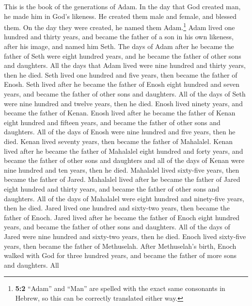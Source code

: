  This is the book of the generations of Adam. In the day
that God created man, he made him in God's likeness.  He
created them male and female, and blessed them. On the day they were
created, he named them Adam.\footnote{\textbf{5:2} ``Adam'' and ``Man''
  are spelled with the exact same consonants in Hebrew, so this can be
  correctly translated either way.}  Adam lived one
hundred and thirty years, and became the father of a son in his own
likeness, after his image, and named him Seth.  The days
of Adam after he became the father of Seth were eight hundred years, and
he became the father of other sons and daughters.  All the
days that Adam lived were nine hundred and thirty years, then he died.
 Seth lived one hundred and five years, then became the
father of Enosh.  Seth lived after he became the father of
Enosh eight hundred and seven years, and became the father of other sons
and daughters.  All of the days of Seth were nine hundred
and twelve years, then he died.  Enosh lived ninety years,
and became the father of Kenan.  Enosh lived after he
became the father of Kenan eight hundred and fifteen years, and became
the father of other sons and daughters.  All of the days
of Enosh were nine hundred and five years, then he died. 
Kenan lived seventy years, then became the father of Mahalalel.
 Kenan lived after he became the father of Mahalalel
eight hundred and forty years, and became the father of other sons and
daughters  and all of the days of Kenan were nine hundred
and ten years, then he died.  Mahalalel lived sixty-five
years, then became the father of Jared.  Mahalalel lived
after he became the father of Jared eight hundred and thirty years, and
became the father of other sons and daughters.  All of
the days of Mahalalel were eight hundred and ninety-five years, then he
died.  Jared lived one hundred and sixty-two years, then
became the father of Enoch.  Jared lived after he became
the father of Enoch eight hundred years, and became the father of other
sons and daughters.  All of the days of Jared were nine
hundred and sixty-two years, then he died.  Enoch lived
sixty-five years, then became the father of Methuselah. 
After Methuselah's birth, Enoch walked with God for three hundred years,
and became the father of more sons and daughters.  All
